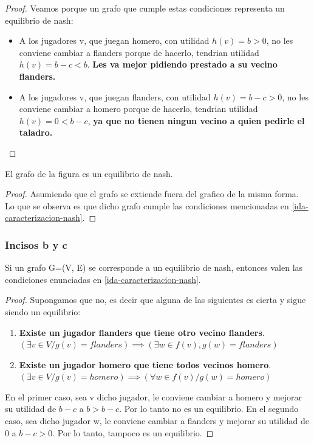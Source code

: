 \begin{proof}
Veamos porque un grafo que cumple estas condiciones representa un equilibrio de nash:
\begin{itemize}
	\item A los jugadores v, que juegan homero, con utilidad $h(v) = b > 0$, no les conviene cambiar a flanders porque de hacerlo, tendrian utilidad $h(v) = b - c < b$. \textbf{Les va mejor pidiendo prestado a su vecino flanders.}
	\item A los jugadores v, que juegan flanders, con utilidad $h(v) = b-c > 0$, no les conviene cambiar a homero porque de hacerlo, tendrian utilidad $h(v) = 0 < b - c$, \textbf{ya que no tienen ningun vecino a quien pedirle el taladro.}
\end{itemize}
\end{proof}

\begin{theorem}
	El grafo de la figura es un equilibrio de nash. 
\end{theorem}
\begin{proof}
Asumiendo que el grafo se extiende fuera del grafico de la misma forma. Lo que se observa es que dicho grafo cumple las condiciones mencionadas en \ref{ida-caracterizacion-nash}.
\end{proof}

\subsubsection{Incisos b y c}

\begin{theorem}
	\label{vuelta-caracterizacion-nash}
	Si un grafo G=(V, E) se corresponde a un equilibrio de nash, entonces valen las condiciones enunciadas en \ref{ida-caracterizacion-nash}.
\end{theorem}
\begin{proof}
	Supongamos que no, es decir que alguna de las siguientes es cierta y sigue siendo un equilibrio:\\
	\begin{enumerate}
		\item \textbf{Existe un jugador flanders que tiene otro vecino flanders}. $(\exists v \in V / g(v) = flanders) \implies (\exists w \in f(v), g(w) = flanders)$ 

		\item \textbf{Existe un jugador homero que tiene todos vecinos homero}. $(\exists v \in V / g(v) = homero) \implies (\forall w \in f(v)/ g(w) = homero)$ 
	\end{enumerate}
	En el primer caso, sea v dicho jugador, le conviene cambiar a homero y mejorar su utilidad de $b-c$ a $b > b-c$. Por lo tanto no es un equilibrio. En el segundo caso, sea dicho jugador w, le conviene cambiar a flanders y mejorar su utilidad de 0 a $b-c >0$. Por lo tanto, tampoco es un equilibrio.
\end{proof}

